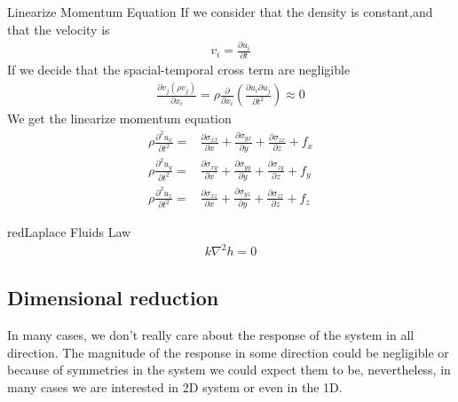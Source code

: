 \documentclass[a4paper, 11pt,article,oneside]{memoir}%
\begin{document}
\begin{eqbox2}{}{Linearize Momentum Equation}
If we consider that the density is constant,and that the velocity is 
\begin{gather*}
v_i=\frac{\partial u_i}{\partial t}
\end{gather*}
If we decide that the spacial-temporal cross term are negligible
\begin{gather*}
\frac{\partial v_j( \rho v_j)}{\partial x_i}=\rho\frac{\partial}{\partial x_i}\left(\frac{\partial  u_i \partial  u_j}{\partial t^2}\right)\approx 0
\end{gather*}
We get the linearize momentum equation
\begin{align*}
\rho \frac{\partial^2u_x}{\partial t^2}=
&\frac{\partial\sigma_{xx}}{\partial x}+\frac{\partial\sigma_{yx}}{\partial y}+\frac{\partial\sigma_{zx}}{\partial z}+f_x\\
\rho \frac{\partial^2u_y}{\partial t^2}=&\frac{\partial\sigma_{xy}}{\partial x}+\frac{\partial\sigma_{yy}}{\partial y}+\frac{\partial\sigma_{zy}}{\partial z}+f_y\\
\rho \frac{\partial^2u_z}{\partial t^2}=&\frac{\partial\sigma_{xz}}{\partial x}+\frac{\partial\sigma_{yz}}{\partial y}+\frac{\partial\sigma_{zz}}{\partial z}+f_z
\end{align*}
\end{eqbox2}


\begin{eqbox2}{red}{Laplace Fluids Law}\label{LaplaceFlow}
\begin{align*}
k\nabla^2h=0
\end{align*}
\end{eqbox2}
\subsection{Dimensional reduction}
In many cases, we don't really care about the response of the system in all direction. The magnitude of the response in some direction could be negligible or because of symmetries in the system we could expect them to be, nevertheless, in many cases we are interested in 2D system or even in the 1D. 
\end{document}

